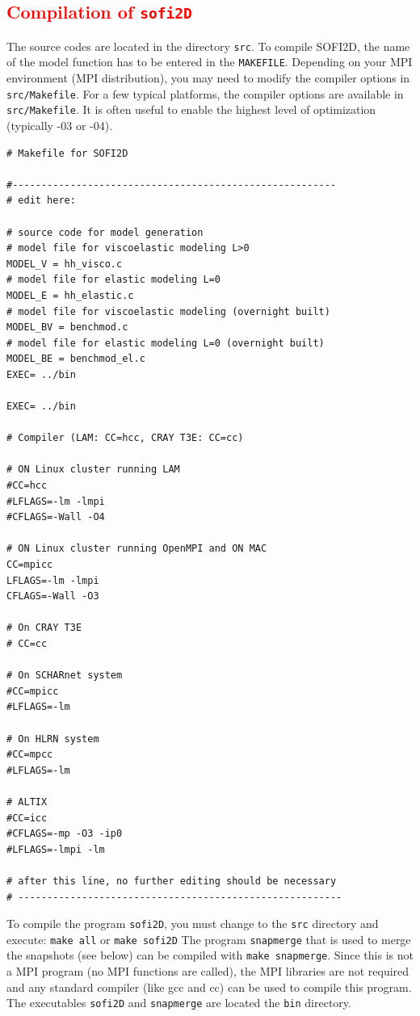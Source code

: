 \textcolor{red}{\subsection{Compilation of \texttt{sofi2D}}}
\label{compexec}
The source codes are located in the directory \texttt{src}. To compile SOFI2D, the name of the model function has to be entered in the \texttt{MAKEFILE}. Depending on your MPI environment (MPI distribution), you may need to modify the compiler options in \texttt{src/Makefile}. For a few typical platforms, the compiler options are available in \texttt{src/Makefile}. It is often useful to enable the highest level of optimization (typically -03 or -04). 
\begin{verbatim}
# Makefile for SOFI2D

#--------------------------------------------------------
# edit here:

# source code for model generation
# model file for viscoelastic modeling L>0
MODEL_V = hh_visco.c
# model file for elastic modeling L=0
MODEL_E = hh_elastic.c
# model file for viscoelastic modeling (overnight built)
MODEL_BV = benchmod.c
# model file for elastic modeling L=0 (overnight built)
MODEL_BE = benchmod_el.c
EXEC= ../bin

EXEC= ../bin

# Compiler (LAM: CC=hcc, CRAY T3E: CC=cc)

# ON Linux cluster running LAM
#CC=hcc
#LFLAGS=-lm -lmpi 
#CFLAGS=-Wall -O4

# ON Linux cluster running OpenMPI and ON MAC
CC=mpicc
LFLAGS=-lm -lmpi 
CFLAGS=-Wall -O3 

# On CRAY T3E
# CC=cc

# On SCHARnet system
#CC=mpicc
#LFLAGS=-lm  

# On HLRN system
#CC=mpcc
#LFLAGS=-lm  

# ALTIX
#CC=icc
#CFLAGS=-mp -O3 -ip0
#LFLAGS=-lmpi -lm 

# after this line, no further editing should be necessary
# --------------------------------------------------------
\end{verbatim}

To compile the program \texttt{sofi2D}, you must change to the \texttt{src} directory and execute:
\texttt{make all}  
or
\texttt{make sofi2D}  
The program \texttt{snapmerge} that is used to merge the snapshots (see below) can be compiled with \texttt{make snapmerge}. Since this is not a MPI program (no MPI functions are called), the MPI libraries are not required and any standard compiler (like gcc and cc) can be used to compile this program. The executables \texttt{sofi2D} and \texttt{snapmerge} are located the \texttt{bin} directory.

